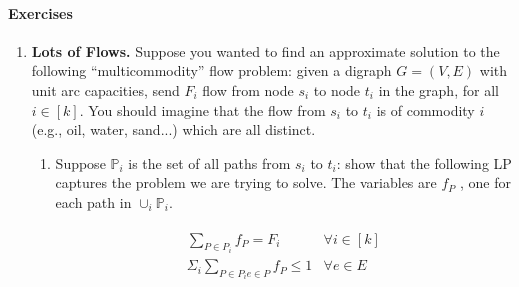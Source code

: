 \documentclass{article}
\theoremstyle{plain}
\renewcommand{\P}{\mathbb{P}}
\newcommand\litem[1]{\item{\bfseries#1.\space}}
\begin{document}
\paragraph{Exercises}
\begin{enumerate}

  \litem{Lots of Flows} Suppose you wanted to find an approximate
  solution to the following “multicommodity” flow problem: given a
  digraph $G = (V, E)$ with unit arc capacities, send $F_i$ flow from
  node $s_i$ to node $t_i$ in the graph, for all $i \in [k]$. You
  should imagine that the flow from $s_i$ to $t_i$ is of commodity $i$
  (e.g., oil, water, sand...) which are all distinct.
  \begin{enumerate}
\item     Suppose $\P_i$
is the set of all paths from $s_i$ to $t_i$: show that the following LP captures the
problem we are trying to solve. The variables are $f_P$ , one for each path in $\cup_i\P_i$.

\begin{align}
  \left.\begin{array} { ll }
          { \sum _ { P \in P _ { i } } f _ { P } = F _ { i } } & { \forall i \in [ k ] } \\
          { \Sigma _ { i } \sum _ { P \in P _ { i } e \in P } f _ { P } \leq 1} & { \forall e \in E }
        \end{array} \right.
\end{align}


\end{enumerate}
\end{enumerate}
\end{document}

